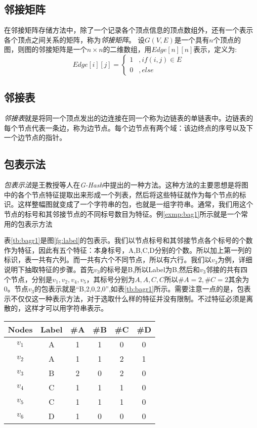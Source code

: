 \documentclass{XDBAthesis}
\begin{document}
\subsection{邻接矩阵}
    在邻接矩阵存储方法中，除了一个记录各个顶点信息的顶点数组外，还有一个表示各个顶点之间关系的矩阵，称为\emph{邻接矩阵}。
设$G(V,E)$是一个具有$n$个顶点的图，则图的邻接矩阵是一个$n\times n$的二维数组，用$Edge[n][n]$表示，定义为:
\begin{equation}
    Edge[i][j]=\left\{
    \begin{aligned}
        1 & , if (i,j)\in E \\
        0 & , else    
    \end{aligned}\right. 
\end{equation}
\subsection{邻接表}
    \emph{邻接表}就是将同一个顶点发出的边连接在同一个称为边链表的单链表中。边链表的每个节点代表一条边，称为边节点。每个边节点有两个域：该边终点的序号以及下一个边节点的指针。
\subsection{包表示法}
\emph{包表示法}是王教授等人在\emph{G-Hash}\cite{ghash}中提出的一种方法。这种方法的主要思想是将图中的各个节点特征提取出来形成一个列表，然后将这些特征就作为每个节点的标识。这样整幅图就变成了一个字符串的包，也就是一组字符串。通常，我们用这个节点的标号和其邻接节点的不同标号数目为特征。例\ref{exmp:bag1}所示就是一个常用的包表示方法
\begin{exmp}
    表\ref{tb:bagr1}是图\ref{fg:label}的包表示。我们以节点标号和其邻接节点各个标号的个数作为特征，因此有五个特征：本身标号，A,B,C,D分别的个数。所以加上第一列的标识，表一共有六列。而一共有六个不同节点，所以有六行。我们以$v_3 $为例，详细说明下抽取特征的步骤。首先$v_3 $的标号是B,所以Label为B,然后和$v_3$邻接的共有四个节点，分别是$v_1 ,v_2 ,v_4 ,v_5 $，其标号分别为$A,A,C,C$所以$\#A=2,\#C=2$其余为0。节点$v_3 $的包表示就是“B,2,0,2,0”,如表\ref{tb:bagr1}所示。需要注意一点的是，包表示不仅仅这一种表示方法，对于选取什么样的特征并没有限制。不过特征必须是离散的，这样才可以用字符串表示。
    \label{exmp:bag1}
\end{exmp}


\begin{minipage}{\textwidth}
    \centering
    \begin{tabular}{c|c|c|c|c|c}
        Nodes & Label & \#A & \#B & \#C & \#D \\ \hline
        $v_1$ & A & 1 & 1 & 0 & 0 \\ \hline
        $v_2$ & A & 1 & 1 & 2 & 1 \\ \hline
        $v_3$ & B & 2 & 0 & 2 & 0 \\ \hline
        $v_4$ & C & 1 & 1 & 1 & 0 \\ \hline
        $v_5$ & C & 1 & 1 & 1 & 0 \\ \hline
        $v_6$ & D & 1 & 0 & 0 & 0 \\ \hline
    \end{tabular}
    \label{tb:bagr1}
\end{minipage}
    
\end{document}
